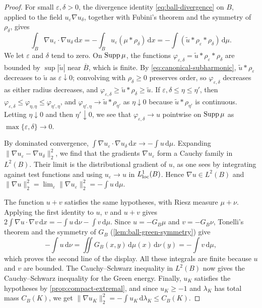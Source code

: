 \begin{proof}
For small $\varepsilon,\delta>0$, the divergence identity \eqref{eq:ball-divergence} on $B$, applied to the field $u_\varepsilon\nabla u_\delta$, together with Fubini's theorem and the symmetry of $\rho_\delta$, gives
\[
 \int_B\nabla u_\varepsilon\mathbin{\cdot}\nabla u_\delta\,\mathrm d x
 =-\int_Bu_\varepsilon(\mu*\rho_\delta)\,\mathrm d x=-\int(\widetilde u*\rho_\varepsilon*\rho_\delta)\,\mathrm d\mu.
\]
We let $\varepsilon$ and $\delta$ tend to zero. On $\operatorname{Supp}\mu$, the functions $\varphi_{\varepsilon,\delta}=\widetilde u*\rho_\varepsilon*\rho_\delta$ are bounded by $\sup|\widetilde u|$ near $\overline B$, which is finite. By \eqref{eq:canonical-subharmonic}, $\widetilde u*\rho_\varepsilon$ decreases to $\widetilde u$ as $\varepsilon\downarrow0$; convolving with $\rho_\delta\geq0$ preserves order, so $\varphi_{\varepsilon,\delta}$ decreases as either radius decreases, and $\varphi_{\varepsilon,\delta}\geq\widetilde u*\rho_\delta\geq\widetilde u$. If $\varepsilon,\delta\leq\eta\leq\eta'$, then $\varphi_{\varepsilon,\delta}\leq\varphi_{\eta,\eta}\leq\varphi_{\eta',\eta}$, and $\varphi_{\eta',\eta}\to\widetilde u*\rho_{\eta'}$ as $\eta\downarrow0$ because $\widetilde u*\rho_{\eta'}$ is continuous. Letting $\eta\downarrow0$ and then $\eta'\downarrow0$, we see that $\varphi_{\varepsilon,\delta}\to u$ pointwise on $\operatorname{Supp}\mu$ as $\max\{\varepsilon,\delta\}\to0$.

By dominated convergence, $\int\nabla u_\varepsilon\mathbin{\cdot}\nabla u_\delta\,\mathrm d x\to-\int u\,\mathrm d\mu$. Expanding $\|\nabla u_\varepsilon-\nabla u_\delta\|_2^2$, we find that the gradients $\nabla u_\varepsilon$ form a Cauchy family in $L^2(B)$. Their limit is the distributional gradient of $u$, as one sees by integrating against test functions and using $u_\varepsilon\to u$ in $L^1_{\mathrm{loc}}(B)$. Hence $\nabla u\in L^2(B)$ and $\|\nabla u\|_2^2=\lim_\varepsilon\|\nabla u_\varepsilon\|_2^2=-\int u\,\mathrm d\mu$.

The function $u+v$ satisfies the same hypotheses, with Riesz measure $\mu+\nu$. Applying the first identity to $u$, $v$ and $u+v$ gives $2\int\nabla u\mathbin{\cdot}\nabla v\,\mathrm dx=-\int u\,\mathrm d\nu-\int v\,\mathrm d\mu$. Since $u=-G_B\mu$ and $v=-G_B\nu$, Tonelli's theorem and the symmetry of $G_B$ (\cref{lem:ball-green-symmetry}) give
\[
 -\int u\,\mathrm d\nu=\iint G_B(x,y)\,\mathrm d\mu(x)\,\mathrm d\nu(y)=-\int v\,\mathrm d\mu,
\]
which proves the second line of the display. All these integrals are finite because $u$ and $v$ are bounded. The Cauchy--Schwarz inequality in $L^2(B)$ now gives the Cauchy--Schwarz inequality for the Green energy. Finally, $u_K$ satisfies the hypotheses by \cref{prop:compact-extremal}, and since $u_K\geq-1$ and $\lambda_K$ has total mass $C_B(K)$, we get $\|\nabla u_K\|_2^2=-\int u_K\,\mathrm d\lambda_K\leq C_B(K)$.
\end{proof}

